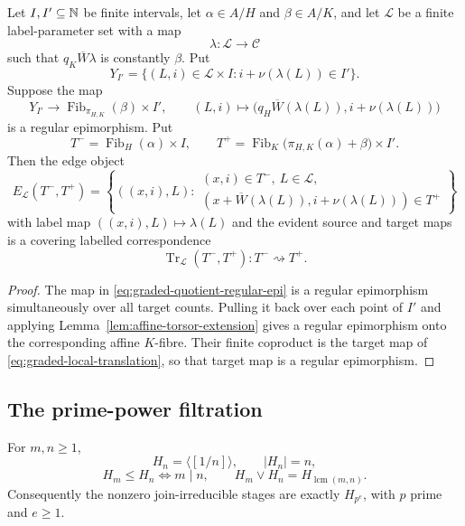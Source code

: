 \begin{corollary}\label{cor:graded-affine-translation}
Let $I,I'\subseteq\mathbb N$ be finite intervals, let $\alpha\in A/H$ and $\beta\in A/K$, and let $\mathscr L$ be a finite label-parameter set with a map
\[
\lambda:\mathscr L\longrightarrow\mathcal C
\]
such that $q_K\overline W\lambda$ is constantly $\beta$.  Put
\[
Y_{I'}=
\{(L,i)\in\mathscr L\times I:i+\nu(\lambda(L))\in I'\}.
\]
Suppose the map
\begin{equation}\label{eq:graded-quotient-regular-epi}
Y_{I'}\longrightarrow
\operatorname{Fib}_{\pi_{H,K}}(\beta)\times I',
\qquad
(L,i)\longmapsto\bigl(q_H\overline W(\lambda(L)),i+\nu(\lambda(L))\bigr)
\end{equation}
is a regular epimorphism.  Put
\[
T^-=\operatorname{Fib}_H(\alpha)\times I,
\qquad
T^+=\operatorname{Fib}_K\!\bigl(\pi_{H,K}(\alpha)+\beta\bigr)\times I'.
\]
Then the edge object
\begin{equation}\label{eq:graded-local-translation}
E_{\mathscr L}(T^-,T^+)
=
\left\{
((x,i),L):
\substack{(x,i)\in T^-,\ L\in\mathscr L,\\
(x+\overline W(\lambda(L)),i+\nu(\lambda(L)))\in T^+}
\right\}
\end{equation}
with label map $((x,i),L)\mapsto\lambda(L)$ and the evident source and target maps is a covering labelled correspondence
\[
\operatorname{Tr}_{\mathscr L}(T^-,T^+):T^-\rightsquigarrow T^+.
\]
\end{corollary}

\begin{proof}
The map in \eqref{eq:graded-quotient-regular-epi} is a regular epimorphism simultaneously over all target counts.  Pulling it back over each point of $I'$ and applying Lemma~\ref{lem:affine-torsor-extension} gives a regular epimorphism onto the corresponding affine $K$-fibre.  Their finite coproduct is the target map of \eqref{eq:graded-local-translation}, so that target map is a regular epimorphism.
\end{proof}

\subsection{The prime-power filtration}

\begin{lemma}\label{lem:torsion-filtration}
For $m,n\ge1$,
\[
H_n=\langle[1/n]\rangle,
\qquad |H_n|=n,
\]
\[
H_m\le H_n\iff m\mid n,
\qquad
H_m\vee H_n=H_{\operatorname{lcm}(m,n)}.
\]
Consequently the nonzero join-irreducible stages are exactly $H_{p^e}$, with $p$ prime and $e\ge1$.
\end{lemma}


